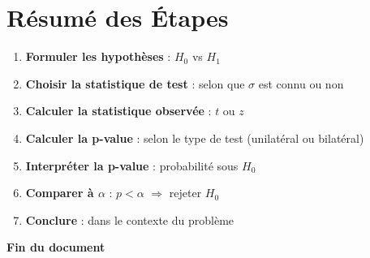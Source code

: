 \documentclass[11pt,a4paper]{article}
\begin{document}
\newpage

\section{Résumé des Étapes}

\begin{enumerate}
    \item \textbf{Formuler les hypothèses} : $H_0$ vs $H_1$
    \item \textbf{Choisir la statistique de test} : selon que $\sigma$ est connu ou non
    \item \textbf{Calculer la statistique observée} : $t$ ou $z$
    \item \textbf{Calculer la p-value} : selon le type de test (unilatéral ou bilatéral)
    \item \textbf{Interpréter la p-value} : probabilité sous $H_0$
    \item \textbf{Comparer à $\alpha$} : $p < \alpha$ $\Rightarrow$ rejeter $H_0$
    \item \textbf{Conclure} : dans le contexte du problème
\end{enumerate}

\vspace{2cm}

\begin{center}
\textbf{Fin du document}
\end{center}
\end{document}
